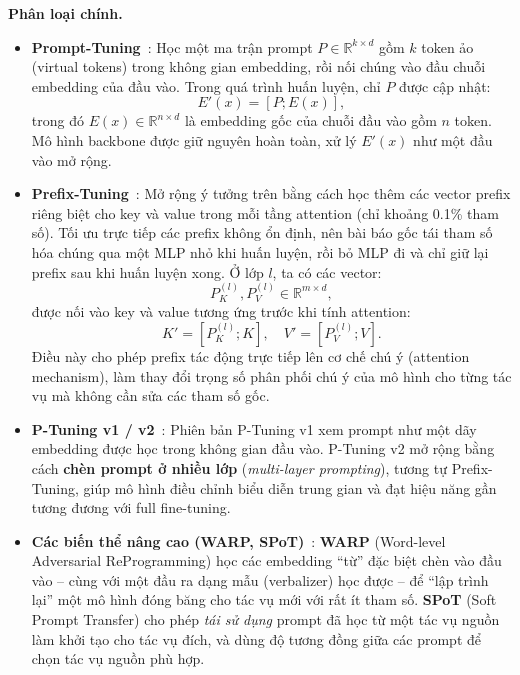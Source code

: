 \textbf{Phân loại chính.}
\begin{itemize}
	\item \textbf{Prompt-Tuning}~\cite{lester2021power}:  
	Học một ma trận prompt $P \in \mathbb{R}^{k \times d}$ gồm $k$ token ảo (virtual tokens) trong không gian embedding, rồi nối chúng vào đầu chuỗi embedding của đầu vào.  
	Trong quá trình huấn luyện, chỉ $P$ được cập nhật:
	\[
	E'(x) = [P; E(x)],
	\]
	trong đó $E(x) \in \mathbb{R}^{n \times d}$ là embedding gốc của chuỗi đầu vào gồm $n$ token.  
	Mô hình backbone được giữ nguyên hoàn toàn, xử lý $E'(x)$ như một đầu vào mở rộng.
	
	\item \textbf{Prefix-Tuning}~\cite{li2021prefix}:
	Mở rộng ý tưởng trên bằng cách học thêm các vector prefix riêng biệt cho key và value trong mỗi tầng attention (chỉ khoảng 0.1\% tham số). Tối ưu trực tiếp các prefix không ổn định, nên bài báo gốc tái tham số hóa chúng qua một MLP nhỏ khi huấn luyện, rồi bỏ MLP đi và chỉ giữ lại prefix sau khi huấn luyện xong.
	Ở lớp $l$, ta có các vector:
	\[
	P^{(l)}_K, P^{(l)}_V \in \mathbb{R}^{m \times d},
	\]
	được nối vào key và value tương ứng trước khi tính attention:
	\[
	K' = [P^{(l)}_K; K], \quad V' = [P^{(l)}_V; V].
	\]
	Điều này cho phép prefix tác động trực tiếp lên cơ chế chú ý (attention mechanism), làm thay đổi trọng số phân phối chú ý của mô hình cho từng tác vụ mà không cần sửa các tham số gốc.
	
	\item \textbf{P-Tuning v1 / v2}~\cite{liu2021p, liu2021ptuningv2}:  
	Phiên bản P-Tuning v1 xem prompt như một dãy embedding được học trong không gian đầu vào.  
	P-Tuning v2 mở rộng bằng cách \textbf{chèn prompt ở nhiều lớp} (\textit{multi-layer prompting}), tương tự Prefix-Tuning, giúp mô hình điều chỉnh biểu diễn trung gian và đạt hiệu năng gần tương đương với full fine-tuning.  
	
	\item \textbf{Các biến thể nâng cao (WARP, SPoT)}~\cite{gheini2022warp, vu2022spot}:
	\textbf{WARP} (Word-level Adversarial ReProgramming) học các embedding “từ” đặc biệt chèn vào đầu vào -- cùng với một đầu ra dạng mẫu (verbalizer) học được -- để “lập trình lại” một mô hình đóng băng cho tác vụ mới với rất ít tham số.
	\textbf{SPoT} (Soft Prompt Transfer) cho phép \emph{tái sử dụng} prompt đã học từ một tác vụ nguồn làm khởi tạo cho tác vụ đích, và dùng độ tương đồng giữa các prompt để chọn tác vụ nguồn phù hợp.
\end{itemize}

